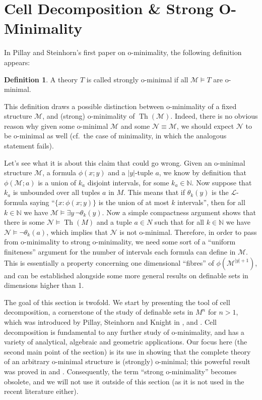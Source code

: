 \documentclass[a4paper]{report}
\newcommand{\ind}{\hspace{15pt}}
\newcommand{\Nat}{\mathbb{N}}
\renewcommand{\L}{\mathcal{L}}
\newcommand{\M}{\mathcal{M}}
\newcommand{\N}{\mathcal{N}}
\DeclareMathOperator{\Th}{Th}
\theoremstyle{definition}
\newtheorem*{defn*}{Definition}
\theoremstyle{remstyle}
\begin{document}
\section{Cell Decomposition \& Strong O-Minimality}

\ind In Pillay and Steinhorn's first paper \cite{defI} on o-minimality, the following definition appears:

\begin{defn*}
	A theory $T$ is called strongly o-minimal if all $\M\models T$ are o-minimal.
\end{defn*}

This definition draws a possible distinction between o-minimality of a fixed structure $\M$, and (strong) o-minimality of $\Th(\M)$. Indeed, there is no obvious reason why given some o-minimal $\M$ and some $\N\equiv\M$, we should expect $\N$ to be o-minimal as well (cf.\ the case of minimality, in which the analogous statement fails).

\ind Let's see what it is about this claim that could go wrong. Given an o-minimal structure $\M$, a formula $\phi(x;y)$ and a $|y|$-tuple $a$, we know by definition that $\phi(\M;a)$ is a union of $k_a$ disjoint intervals, for some $k_a\in \Nat$. Now suppose that $k_a$ is unbounded over all tuples $a$ in $M$. This means that if $\theta_k(y)$ is the $\L$-formula saying ``$\{x:\phi(x;y)\}$ is the union of at most $k$ intervals'', then for all $k\in \Nat$ we have $\M\models \exists y\,\neg\theta_k(y)$. Now a simple compactness argument shows that there is some $\N\models \Th(M)$ and a tuple $a\in N$ such that for all $k\in\Nat$ we have $\N\models\neg\theta_k(a)$, which implies that $\N$ is not o-minimal. Therefore, in order to pass from o-minimality to strong o-minimality, we need some sort of a ``uniform finiteness'' argument for the number of intervals each formula can define in $\M$. This is essentially a property concerning one dimensional ``fibres'' of $\phi(\M^{|y|+1})$, and can be established alongside some more general results on definable sets in dimensions higher than 1.

\ind The goal of this section is twofold. We start by presenting the tool of cell decomposition, a cornerstone of the study of definable sets in $M^n$ for $n>1$, which was introduced by Pillay, Steinhorn and Knight in \cite{defII}, \cite{discrete} and \cite{defIII}. Cell decomposition is fundamental to any further study of o-minimality, and has a variety of analytical, algebraic and geometric applications. Our focus here (the second main point of the section) is its use in showing that the complete theory of an arbitrary o-minimal structure is (strongly) o-minimal; this powerful result was proved in \cite{defII} and \cite{defIII}. Consequently, the term ``strong o-minimality'' becomes obsolete, and we will not use it outside of this section (as it is not used in the recent literature either).
\end{document}
